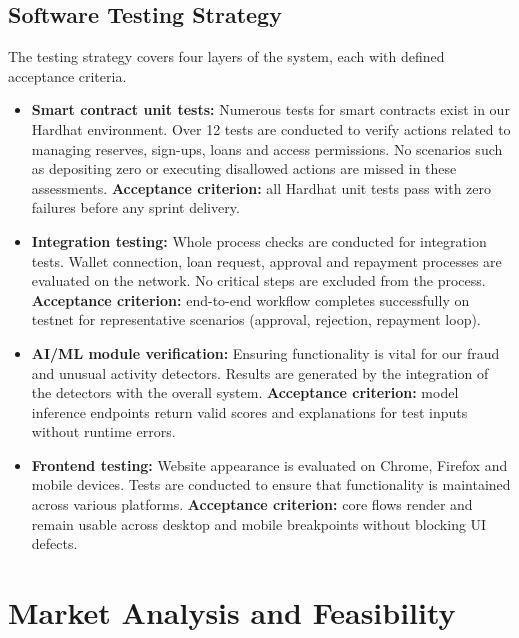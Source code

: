 \documentclass[12pt,a4paper]{report}
\begin{document}
\section{Software Testing Strategy}

The testing strategy covers four layers of the system, each with defined acceptance criteria.

\begin{itemize}[noitemsep]
\item \textbf{Smart contract unit tests:} Numerous tests for smart contracts exist in our Hardhat environment. Over 12 tests are conducted to verify actions related to managing reserves, sign-ups, loans and access permissions. No scenarios such as depositing zero or executing disallowed actions are missed in these assessments. \textbf{Acceptance criterion:} all Hardhat unit tests pass with zero failures before any sprint delivery.
\item \textbf{Integration testing:} Whole process checks are conducted for integration tests. Wallet connection, loan request, approval and repayment processes are evaluated on the network. No critical steps are excluded from the process. \textbf{Acceptance criterion:} end-to-end workflow completes successfully on testnet for representative scenarios (approval, rejection, repayment loop).
\item \textbf{AI/ML module verification:} Ensuring functionality is vital for our fraud and unusual activity detectors. Results are generated by the integration of the detectors with the overall system. \textbf{Acceptance criterion:} model inference endpoints return valid scores and explanations for test inputs without runtime errors.
\item \textbf{Frontend testing:} Website appearance is evaluated on Chrome, Firefox and mobile devices. Tests are conducted to ensure that functionality is maintained across various platforms. \textbf{Acceptance criterion:} core flows render and remain usable across desktop and mobile breakpoints without blocking UI defects.
\end{itemize}


\chapter{Market Analysis and Feasibility}
\end{document}
